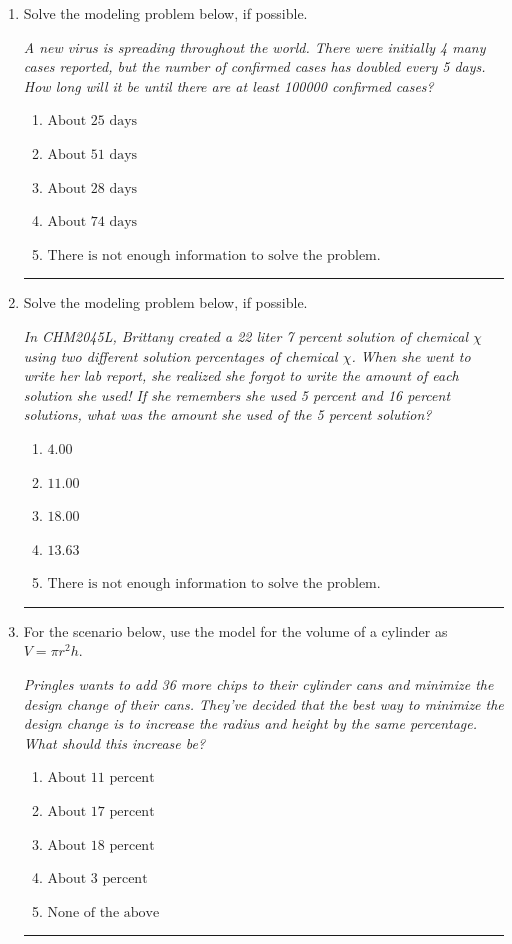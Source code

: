 \documentclass[14pt]{extbook}
\newcommand{\litem}[1]{\item#1\hspace*{-1cm}\rule{\textwidth}{0.4pt}}
\begin{document}
\begin{enumerate}
{\begin{enumerate}[label=\Alph*.]
\end{enumerate} }
\litem{
Solve the modeling problem below, if possible.
\begin{center}
    \textit{ A new virus is spreading throughout the world. There were initially 4 many cases reported, but the number of confirmed cases has doubled every 5 days. How long will it be until there are at least 100000 confirmed cases? }
\end{center}
\begin{enumerate}[label=\Alph*.]
\item \( \text{About } 25 \text{ days} \)
\item \( \text{About } 51 \text{ days} \)
\item \( \text{About } 28 \text{ days} \)
\item \( \text{About } 74 \text{ days} \)
\item \( \text{There is not enough information to solve the problem.} \)

\end{enumerate} }
\litem{
Solve the modeling problem below, if possible.
\begin{center}
    \textit{ In CHM2045L, Brittany created a 22 liter 7 percent solution of chemical $\chi$ using two different solution percentages of chemical $\chi$. When she went to write her lab report, she realized she forgot to write the amount of each solution she used! If she remembers she used 5 percent and 16 percent solutions, what was the amount she used of the 5 percent solution? }
\end{center}
\begin{enumerate}[label=\Alph*.]
\item \( 4.00 \)
\item \( 11.00 \)
\item \( 18.00 \)
\item \( 13.63 \)
\item \( \text{There is not enough information to solve the problem.} \)

\end{enumerate} }
\litem{
For the scenario below, use the model for the volume of a cylinder as $V = \pi r^2 h$.
\begin{center}
    \textit{ Pringles wants to add 36 \text{percent} more chips to their cylinder cans and minimize the design change of their cans. They've decided that the best way to minimize the design change is to increase the radius and height by the same percentage. What should this increase be? }
\end{center}
\begin{enumerate}[label=\Alph*.]
\item \( \text{About } 11 \text{ percent} \)
\item \( \text{About } 17 \text{ percent} \)
\item \( \text{About } 18 \text{ percent} \)
\item \( \text{About } 3 \text{ percent} \)
\item \( \text{None of the above} \)

\end{enumerate} }
\end{enumerate}
\end{document}
